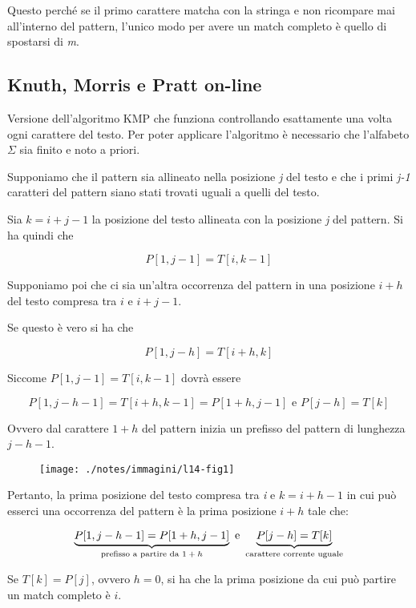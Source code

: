 Questo perché se il primo carattere matcha con la stringa e non
ricompare mai all'interno del pattern, l'unico modo per avere un match
completo è quello di spostarsi di \emph{m}.

\subsection{Knuth, Morris e Pratt on-line}\label{knuth-morris-e-pratt-on-line}

Versione dell'algoritmo \textsc{KMP} che funziona controllando esattamente una volta ogni carattere del testo. Per poter applicare l'algoritmo è necessario che l'alfabeto $ \Sigma $ sia finito e noto a
priori.

Supponiamo che il pattern sia allineato nella posizione \textit{j} del testo e che i primi \textit{j-1} caratteri del pattern siano stati trovati uguali a quelli del testo.

Sia $ k =i+j-1 $ la posizione del testo allineata con la posizione \textit{j} del pattern. Si ha quindi che 

$$
P[1, j-1] = T[i, k-1]
$$

Supponiamo poi che ci sia un'altra occorrenza del pattern in una posizione $ i+h $ del testo compresa tra $ i$ e $ i+j-1 $.

Se questo è vero si ha che 

$$
P[1, j-h] = T[i+h,k]
$$

Siccome $ P[1,j-1] = T[i , k-1] $ dovrà essere

$$
P[1, j-h-1] = T[i+h, k-1] = P[1+h, j-1] \text{ e } P[j-h] = T[k]
$$

Ovvero dal carattere $ 1+h $ del pattern inizia un prefisso del pattern di lunghezza $ j -h -1 $.

\begin{figure}[htbp]
	\centering
	\texttt{[image: ./notes/immagini/l14-fig1]}
\end{figure}

Pertanto, la prima posizione del testo compresa tra \textit{i} e $ k = i + h -1 $  in cui può esserci una occorrenza del pattern è la prima posizione $ i+h $ tale che:

$$
\underbrace{P[1, j -h -1] = P[1+h, j -1]}_{\text{prefisso a partire da $ 1+h $}} \text{ e } \underbrace{P[j-h] = T[k]}_{\text{carattere corrente uguale}}
$$

Se $ T[k] = P[j] $, ovvero $ h=0 $, si ha che la prima posizione da cui può partire un match completo è $ i $.

